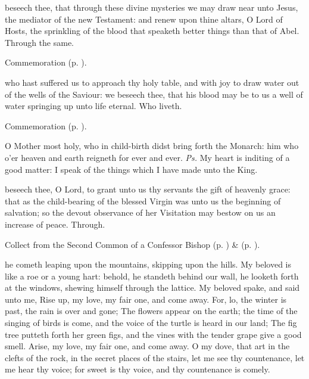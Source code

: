 \secret
{} beseech thee, that through these divine mysteries we may draw near unto Jesus, the mediator of the new Testament: and renew upon thine altars, O Lord of Hosts, the sprinkling of the blood that speaketh better things than that of Abel. Through the same.

\begin{rubric}
    Commemoration  (p. \pageref{JohnBaptistSecret}).
\end{rubric}


\postcommunion
{} who hast suffered us to approach thy holy table, and with joy to draw water out of the wells of the Saviour: we beseech thee, that his blood may be to us a well of water springing up unto life eternal. Who liveth.

\begin{rubric}
    Commemoration  (p. \pageref{JohnBaptistPC}).
\end{rubric}



\introit
{} O Mother most holy, who in child-birth didst bring forth the Monarch: him who o'er heaven and earth reigneth for ever and ever. \textit{Ps.} My heart is inditing of a good matter: I speak of the things which I have made unto the King.

\collect
{} beseech thee, O Lord, to grant unto us thy servants the gift of heavenly grace: that as the child-bearing of the blessed Virgin was unto us the beginning of salvation; so the devout observance of her Visitation may bestow on us an increase of peace. Through.

\begin{rubric}
	  Collect  from the Second Common of a Confessor Bishop (p. \pageref{CommonConfessorBishopIICollect}) \&   (p. \pageref{ProcessusCollect}).
\end{rubric}

 he cometh leaping upon the mountains, skipping upon the hills. My beloved is like a roe or a young hart: behold, he standeth behind our wall, he looketh forth at the windows, shewing himself through the lattice. My beloved spake, and said unto me, Rise up, my love, my fair one, and come away. For, lo, the winter is past, the rain is over and gone; The flowers appear on the earth; the time of the singing of birds is come, and the voice of the turtle is heard in our land; The fig tree putteth forth her green figs, and the vines with the tender grape give a good smell. Arise, my love, my fair one, and come away. O my dove, that art in the clefts of the rock, in the secret places of the stairs, let me see thy countenance, let me hear thy voice; for sweet is thy voice, and thy countenance is comely.

